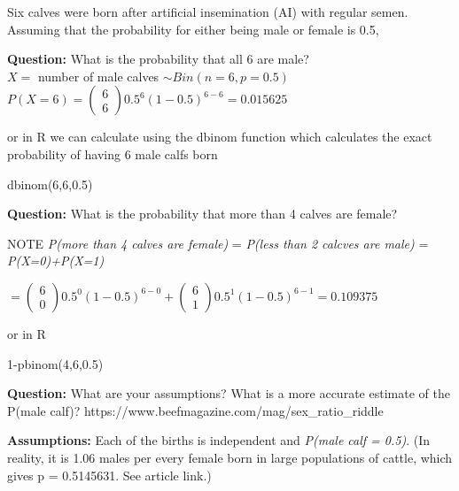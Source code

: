 \documentclass[
  10pt,
  letterpaper,
  DIV=11,
  numbers=noendperiod]{scrartcl}
\newenvironment{Shaded}{\begin{snugshade}}{\end{snugshade}}
\newcommand{\DecValTok}[1]{\textcolor[rgb]{0.68,0.00,0.00}{#1}}
\newcommand{\FloatTok}[1]{\textcolor[rgb]{0.68,0.00,0.00}{#1}}
\newcommand{\FunctionTok}[1]{\textcolor[rgb]{0.28,0.35,0.67}{#1}}
\newcommand{\NormalTok}[1]{\textcolor[rgb]{0.00,0.23,0.31}{#1}}
\newcommand{\SpecialCharTok}[1]{\textcolor[rgb]{0.37,0.37,0.37}{#1}}
\begin{document}
Six calves were born after artificial insemination (AI) with regular
semen. Assuming that the probability for either being male or female is
0.5,

\textbf{Question:} What is the probability that all 6 are male?\\

\(X=\) number of male calves \(\sim Bin(n=6,p=0.5)\)
\(P(X=6)=\left(\begin{matrix}6\\6\end{matrix}\right)0.5^6(1-0.5)^{6-6} = 0.015625\)

or in R we can calculate using the dbinom function which calculates the
exact probability of having 6 male calfs born

\begin{Shaded}
\begin{Highlighting}[]
\FunctionTok{dbinom}\NormalTok{(}\DecValTok{6}\NormalTok{,}\DecValTok{6}\NormalTok{,}\FloatTok{0.5}\NormalTok{)}
\end{Highlighting}
\end{Shaded}

\textbf{Question:} What is the probability that more than 4 calves are
female?

NOTE \emph{P(more than 4 calves are female)} = \emph{P(less than 2
calcves are male)} = \emph{P(X=0)+P(X=1)}

\(=\left(\begin{matrix}6\\0\end{matrix}\right)0.5^0(1-0.5)^{6-0}+\left(\begin{matrix}6\\1\end{matrix}\right)0.5^1(1-0.5)^{6-1} = 0.109375\)

or in R

\begin{Shaded}
\begin{Highlighting}[]
\DecValTok{1}\SpecialCharTok{{-}}\FunctionTok{pbinom}\NormalTok{(}\DecValTok{4}\NormalTok{,}\DecValTok{6}\NormalTok{,}\FloatTok{0.5}\NormalTok{)}
\end{Highlighting}
\end{Shaded}

\textbf{Question:} What are your assumptions? What is a more accurate
estimate of the P(male calf)?
https://www.beefmagazine.com/mag/sex\_ratio\_riddle

\textbf{Assumptions:} Each of the births is independent and \emph{P(male
calf = 0.5)}. (In reality, it is 1.06 males per every female born in
large populations of cattle, which gives p = 0.5145631. See article
link.)
\end{document}
